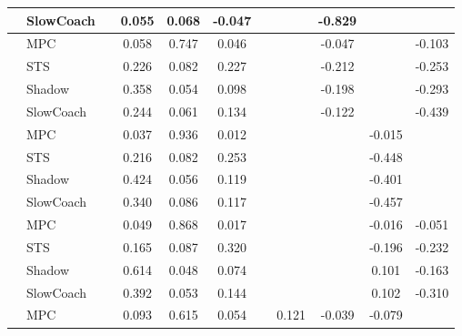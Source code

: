 \begin{tabular}{|l|l|*{9}{c|}}
                                                           & SlowCoach &       &     0.055 &     0.068 & -0.047 &     &     &  -0.829 &      &       \\
\midrule
[False, True, True, True, False, False, True, False, True] & MPC &       &     0.058 &     0.747 &  0.046 &     &     &  -0.047 &      &   -0.103 \\
                                                           & STS &       &     0.226 &     0.082 &  0.227 &     &     &  -0.212 &      &   -0.253 \\
                                                           & Shadow &       &     0.358 &     0.054 &  0.098 &     &     &  -0.198 &      &   -0.293 \\
                                                           & SlowCoach &       &     0.244 &     0.061 &  0.134 &     &     &  -0.122 &      &   -0.439 \\
\midrule
[False, True, True, True, False, False, False, True, False] & MPC &       &     0.037 &     0.936 &  0.012 &     &     &      &  -0.015 &       \\
                                                           & STS &       &     0.216 &     0.082 &  0.253 &     &     &      &  -0.448 &       \\
                                                           & Shadow &       &     0.424 &     0.056 &  0.119 &     &     &      &  -0.401 &       \\
                                                           & SlowCoach &       &     0.340 &     0.086 &  0.117 &     &     &      &  -0.457 &       \\
\midrule
[False, True, True, True, False, False, False, True, True] & MPC &       &     0.049 &     0.868 &  0.017 &     &     &      &  -0.016 &   -0.051 \\
                                                           & STS &       &     0.165 &     0.087 &  0.320 &     &     &      &  -0.196 &   -0.232 \\
                                                           & Shadow &       &     0.614 &     0.048 &  0.074 &     &     &      &   0.101 &   -0.163 \\
                                                           & SlowCoach &       &     0.392 &     0.053 &  0.144 &     &     &      &   0.102 &   -0.310 \\
\midrule
[False, True, True, True, False, True, True, True, False] & MPC &       &     0.093 &     0.615 &  0.054 &     &  0.121 &  -0.039 &  -0.079 &       \\

\end{tabular}
